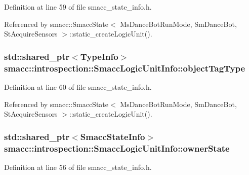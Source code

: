 Definition at line 59 of file smacc\+\_\+state\+\_\+info.\+h.



Referenced by smacc\+::\+Smacc\+State$<$ Ms\+Dance\+Bot\+Run\+Mode, Sm\+Dance\+Bot, St\+Acquire\+Sensors $>$\+::static\+\_\+create\+Logic\+Unit().

\subsubsection[{\texorpdfstring{object\+Tag\+Type}{objectTagType}}]{\setlength{\rightskip}{0pt plus 5cm}std\+::shared\+\_\+ptr$<${\bf Type\+Info}$>$ smacc\+::introspection\+::\+Smacc\+Logic\+Unit\+Info\+::object\+Tag\+Type}\hypertarget{structsmacc_1_1introspection_1_1SmaccLogicUnitInfo_a4a1fc60624c6ad423c28a0bece4805ea}{}\label{structsmacc_1_1introspection_1_1SmaccLogicUnitInfo_a4a1fc60624c6ad423c28a0bece4805ea}


Definition at line 60 of file smacc\+\_\+state\+\_\+info.\+h.



Referenced by smacc\+::\+Smacc\+State$<$ Ms\+Dance\+Bot\+Run\+Mode, Sm\+Dance\+Bot, St\+Acquire\+Sensors $>$\+::static\+\_\+create\+Logic\+Unit().

\subsubsection[{\texorpdfstring{owner\+State}{ownerState}}]{\setlength{\rightskip}{0pt plus 5cm}std\+::shared\+\_\+ptr$<${\bf Smacc\+State\+Info}$>$ smacc\+::introspection\+::\+Smacc\+Logic\+Unit\+Info\+::owner\+State}\hypertarget{structsmacc_1_1introspection_1_1SmaccLogicUnitInfo_a9b6a74ef053eb083efc64febe1bb9db2}{}\label{structsmacc_1_1introspection_1_1SmaccLogicUnitInfo_a9b6a74ef053eb083efc64febe1bb9db2}


Definition at line 56 of file smacc\+\_\+state\+\_\+info.\+h.

